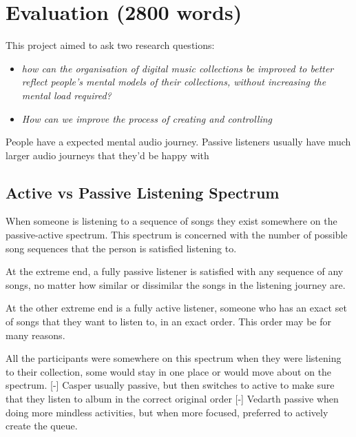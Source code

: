 \chapter{Evaluation (2800 words)}
This project aimed to ask two research questions:\begin{itemize}
    \item \textit{how can the organisation of digital music collections be improved to better reflect people's mental models of their collections, without increasing the mental load required?}
    \item \textit{How can we improve the process of creating and controlling}
\end{itemize}

People have a expected mental audio journey. Passive listeners usually have much larger audio journeys that they'd be happy with

\section{Active vs Passive Listening Spectrum}
When someone is listening to a sequence of songs they exist somewhere on the passive-active spectrum. This spectrum is concerned with the number of possible song sequences that the person is satisfied listening to.

At the extreme end, a fully passive listener is satisfied with any sequence of any songs, no matter how similar or dissimilar the songs in the listening journey are.

At the other extreme end is a fully active listener, someone who has an exact set of songs that they want to listen to, in an exact order. This order may be for many reasons.

All the participants were somewhere on this spectrum when they were listening to their collection, some would stay in one place or would move about on the spectrum.
[-] Casper usually passive, but then switches to active to make sure that they listen to album in the correct original order
[-] Vedarth passive when doing more mindless activities, but when more focused, preferred to actively create the queue.

